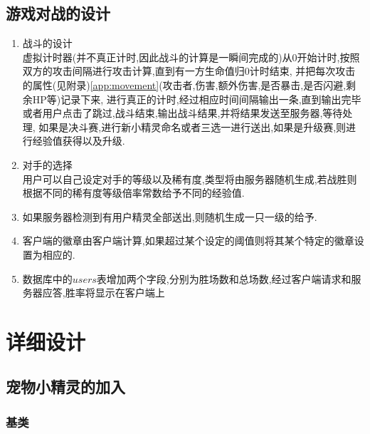 \documentclass{article}
\begin{document}
\subsection{游戏对战的设计}
  \begin{enumerate}
  \item 战斗的设计\\
    虚拟计时器(并不真正计时,因此战斗的计算是一瞬间完成的)从0开始计时,按照双方的攻击间隔进行攻击计算,直到有一方生命值归0计时结束,
    并把每次攻击的属性(见附录)\ref{app:movement}(攻击者,伤害,额外伤害,是否暴击,是否闪避,剩余HP等)记录下来,
    进行真正的计时,经过相应时间间隔输出一条,直到输出完毕或者用户点击了跳过,战斗结束,输出战斗结果,并将结果发送至服务器,等待处理,
    如果是决斗赛,进行新小精灵命名或者三选一进行送出,如果是升级赛,则进行经验值获得以及升级.
  \item 对手的选择\\
    用户可以自己设定对手的等级以及稀有度,类型将由服务器随机生成,若战胜则根据不同的稀有度等级倍率常数给予不同的经验值.
  \item 如果服务器检测到有用户精灵全部送出,则随机生成一只一级的给予.
  \item 客户端的徽章由客户端计算,如果超过某个设定的阈值则将其某个特定的徽章设置为相应的.
  \item 数据库中的$users$表增加两个字段,分别为胜场数和总场数,经过客户端请求和服务器应答,胜率将显示在客户端上
  \end{enumerate}
  

\section{详细设计}
\label{sec:detail}

\subsection{宠物小精灵的加入}

  \subsubsection{基类}
  
\end{document}
